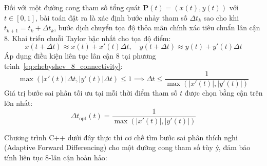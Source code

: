 Đối với một đường cong tham số tổng quát $\mathbf{P}(t) = (x(t), y(t))$ với $t \in [0, 1]$, bài toán đặt ra là xác định bước nhảy tham số $\Delta t_k$ sao cho khi $t_{k+1} = t_k + \Delta t_k$, bước dịch chuyển tọa độ thỏa mãn chính xác tiêu chuẩn lân cận 8. Khai triển chuỗi Taylor bậc nhất cho tọa độ điểm:
\begin{equation}
x(t + \Delta t) \approx x(t) + x'(t)\Delta t, \quad y(t + \Delta t) \approx y(t) + y'(t)\Delta t
\end{equation}
Áp dụng điều kiện liên tục lân cận 8 tại phương trình~\eqref{eq:chebyshev_8_connectivity}:
\begin{equation}
\max\left( |x'(t)| \Delta t, |y'(t)| \Delta t \right) \le 1 \implies \Delta t \le \frac{1}{\max\left( |x'(t)|, |y'(t)| \right)}
\end{equation}
Giá trị bước sai phân tối ưu tại mỗi thời điểm tham số $t$ được chọn bằng cận trên lớn nhất:
\begin{equation}
\label{eq:optimal_delta_t}
\Delta t_{\text{opt}}(t) = \frac{1}{\max\left( |x'(t)|, |y'(t)| \right)}
\end{equation}

Chương trình C++ dưới đây thực thi cơ chế tìm bước sai phân thích nghi (Adaptive Forward Differencing) cho một đường cong tham số tùy ý, đảm bảo tính liên tục 8-lân cận hoàn hảo:

